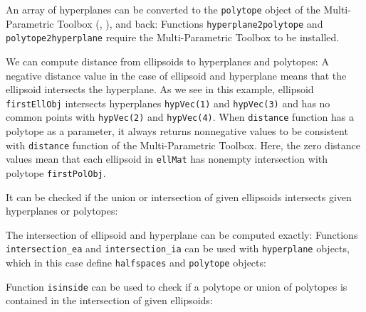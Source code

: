 An array of hyperplanes can be converted to the {\tt polytope} object of the
Multi-Parametric Toolbox (\cite{morari}, \cite{mpt}), and back:
Functions {\tt hyperplane2polytope} and {\tt polytope2hyperplane} require
the Multi-Parametric Toolbox to be installed.

We can compute distance from ellipsoids to hyperplanes and polytopes:
A negative distance value in the case of ellipsoid and hyperplane means that
the ellipsoid intersects the hyperplane. As we see in this example, ellipsoid
{\tt firstEllObj} intersects  hyperplanes {\tt hypVec(1)} and {\tt hypVec(3)} and has
no common points with {\tt hypVec(2)} and {\tt hypVec(4)}. When {\tt distance} function
has a polytope as a parameter, it always returns nonnegative values to be
consistent with {\tt distance} function of the Multi-Parametric Toolbox.
Here, the zero distance values mean that each ellipsoid in {\tt ellMat} has
nonempty intersection with polytope {\tt firstPolObj}.

It can be checked if the union or intersection of given ellipsoids intersects
given hyperplanes or polytopes:



The intersection of ellipsoid and hyperplane can be computed exactly:
Functions {\tt intersection\_ea} and {\tt intersection\_ia} can be used
with {\tt hyperplane} objects, which in this case define {\tt halfspaces} and
{\tt polytope} objects:

Function {\tt isinside} can be used to check if a polytope or union of
polytopes is contained in the intersection of given ellipsoids:


